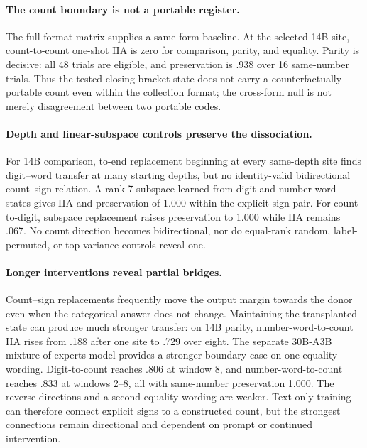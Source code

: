 \documentclass[11pt]{article}
\begin{document}
\paragraph{The count boundary is not a portable register.}

The full format matrix supplies a same-form baseline. At the selected 14B
site, count-to-count one-shot IIA is zero
for comparison, parity, and equality. Parity is decisive: all 48 trials are
eligible, and preservation is .938 over 16 same-number trials. Thus the tested
closing-bracket state does not carry a counterfactually portable count even
within the collection format; the cross-form null is not merely disagreement
between two portable codes.

\paragraph{Depth and linear-subspace controls preserve the dissociation.}

For 14B comparison, to-end replacement beginning at every same-depth site
finds digit--word transfer at many starting depths, but no identity-valid
bidirectional count--sign relation. A rank-7 subspace learned from digit and
number-word states gives IIA and preservation of 1.000 within the explicit
sign pair. For count-to-digit, subspace replacement raises preservation to
1.000 while IIA remains .067. No count direction becomes bidirectional, nor
do equal-rank random, label-permuted, or top-variance controls reveal one.

\paragraph{Longer interventions reveal partial bridges.}

Count--sign replacements frequently move the output margin towards the
donor even when the categorical answer does not change. Maintaining the
transplanted state can produce much stronger transfer: on 14B parity,
number-word-to-count IIA rises from .188 after one site to .729 over eight.
The separate 30B-A3B mixture-of-experts model provides a stronger boundary
case on one equality wording. Digit-to-count reaches .806 at window 8, and
number-word-to-count reaches .833 at windows 2--8, all with same-number
preservation 1.000. The reverse directions and a second equality wording are
weaker. Text-only training can therefore connect explicit signs to a
constructed count, but the strongest connections remain directional and
dependent on prompt or continued intervention.
\end{document}
